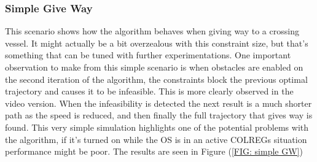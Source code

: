\subsubsection{Simple Give Way}
This scenario shows how the algorithm behaves when giving way to a crossing vessel. It might actually be a bit overzealous with this
constraint size, but that's something that can be tuned with further experimentations. One important observation to make from this
simple scenario is when obstacles are enabled on the second iteration of the algorithm, the constraints block the previous optimal
trajectory and causes it to be infeasible. This is more clearly observed in the video version. When the infeasibility is detected
the next result is a much shorter path as the speed is reduced, and then finally the full trajectory that gives way is found.
This very simple simulation highlights one of the potential problems with the algorithm, if it's turned on while the OS is in an active
COLREGs situation performance might be poor. The results are seen in Figure (\ref{FIG: simple GW})


